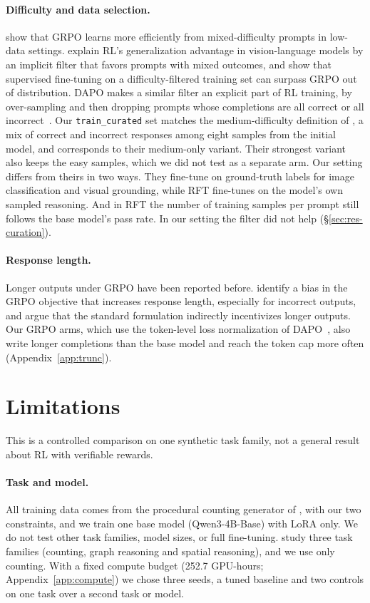 \documentclass{article}
\begin{document}
\paragraph{Difficulty and data selection.} \citet{bauer2026} show that GRPO learns more efficiently from mixed-difficulty prompts in low-data settings. \citet{lu2026why} explain RL's generalization advantage in vision-language models by an implicit filter that favors prompts with mixed outcomes, and show that supervised fine-tuning on a difficulty-filtered training set can surpass GRPO out of distribution. DAPO makes a similar filter an explicit part of RL training, by over-sampling and then dropping prompts whose completions are all correct or all incorrect~\citep{yu2025dapo}. Our \texttt{train\_curated} set matches the medium-difficulty definition of \citet{lu2026why}, a mix of correct and incorrect responses among eight samples from the initial model, and corresponds to their medium-only variant. Their strongest variant also keeps the easy samples, which we did not test as a separate arm. Our setting differs from theirs in two ways. They fine-tune on ground-truth labels for image classification and visual grounding, while RFT fine-tunes on the model's own sampled reasoning. And in RFT the number of training samples per prompt still follows the base model's pass rate. In our setting the filter did not help (\S\ref{sec:res-curation}).

\paragraph{Response length.} Longer outputs under GRPO have been reported before. \citet{liu2025understanding} identify a bias in the GRPO objective that increases response length, especially for incorrect outputs, and \citet{samineni2025rl} argue that the standard formulation indirectly incentivizes longer outputs. Our GRPO arms, which use the token-level loss normalization of DAPO~\citep{yu2025dapo}, also write longer completions than the base model and reach the token cap more often (Appendix~\ref{app:trunc}).

\section{Limitations}
\label{sec:limitations}

This is a controlled comparison on one synthetic task family, not a general result about RL with verifiable rewards.

\paragraph{Task and model.} All training data comes from the procedural counting generator of \citet{bauer2026}, with our two constraints, and we train one base model (Qwen3-4B-Base) with LoRA only. We do not test other task families, model sizes, or full fine-tuning. \citet{bauer2026} study three task families (counting, graph reasoning and spatial reasoning), and we use only counting. With a fixed compute budget (252.7 GPU-hours; Appendix~\ref{app:compute}) we chose three seeds, a tuned baseline and two controls on one task over a second task or model.
\end{document}
